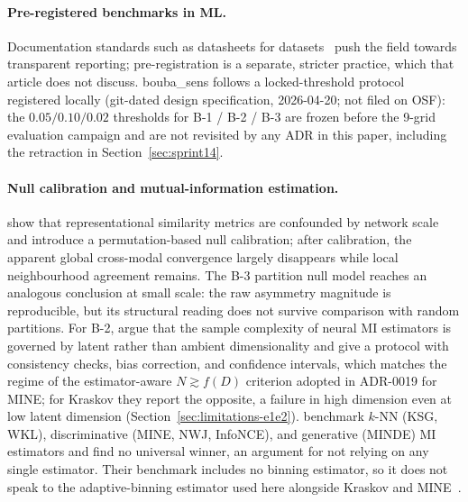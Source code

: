 \documentclass{article}
\begin{document}
\paragraph{Pre-registered benchmarks in ML.}
Documentation standards such as datasheets for
datasets~\citep{gebru2021datasheets} push the field towards
transparent reporting; pre-registration is a separate, stricter
practice, which that article does not discuss.
bouba\_sens follows a locked-threshold
protocol registered locally (git-dated design specification,
2026-04-20; not filed on OSF): the $0.05 / 0.10 / 0.02$
thresholds for B-1 / B-2 / B-3 are frozen before the 9-grid
evaluation campaign and are not revisited by any ADR in this
paper, including the retraction in Section~\ref{sec:sprint14}.

\paragraph{Null calibration and mutual-information estimation.}
\citet{groger2026aristotelian} show that representational
similarity metrics are confounded by network scale and introduce a
permutation-based null calibration; after calibration, the apparent
global cross-modal convergence largely disappears while local
neighbourhood agreement remains. The B-3 partition null model
reaches an analogous conclusion at small scale: the raw asymmetry
magnitude is reproducible, but its structural reading does not
survive comparison with random partitions. For B-2,
\citet{abdelaleem2025accurate} argue that the sample complexity of
neural MI estimators is governed by latent rather than ambient
dimensionality and give a protocol with consistency checks, bias
correction, and confidence intervals, which matches the regime of
the estimator-aware $N \gtrsim f(D)$ criterion adopted in ADR-0019
for MINE; for Kraskov they report the opposite, a failure in high
dimension even at low latent dimension (Section~\ref{sec:limitations-e1e2}).
\citet{foresti2026mibench} benchmark $k$-NN (KSG, WKL),
discriminative (MINE, NWJ, InfoNCE), and generative (MINDE) MI
estimators and find no universal winner, an argument for not relying
on any single estimator. Their benchmark includes no binning
estimator, so it does not speak to the adaptive-binning estimator
used here alongside Kraskov and
MINE~\citep{kraskov2004estimating, belghazi2018mine}.
\end{document}
